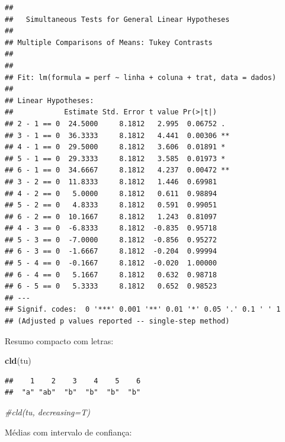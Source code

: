 \documentclass[
]{book}
\newenvironment{Shaded}{\begin{snugshade}}{\end{snugshade}}
\newcommand{\CommentTok}[1]{\textcolor[rgb]{0.56,0.35,0.01}{\textit{#1}}}
\newcommand{\DataTypeTok}[1]{\textcolor[rgb]{0.13,0.29,0.53}{#1}}
\newcommand{\KeywordTok}[1]{\textcolor[rgb]{0.13,0.29,0.53}{\textbf{#1}}}
\newcommand{\NormalTok}[1]{#1}
\newcommand{\OperatorTok}[1]{\textcolor[rgb]{0.81,0.36,0.00}{\textbf{#1}}}
\newcommand{\StringTok}[1]{\textcolor[rgb]{0.31,0.60,0.02}{#1}}
\begin{document}
\begin{verbatim}
## 
##   Simultaneous Tests for General Linear Hypotheses
## 
## Multiple Comparisons of Means: Tukey Contrasts
## 
## 
## Fit: lm(formula = perf ~ linha + coluna + trat, data = dados)
## 
## Linear Hypotheses:
##            Estimate Std. Error t value Pr(>|t|)   
## 2 - 1 == 0  24.5000     8.1812   2.995  0.06752 . 
## 3 - 1 == 0  36.3333     8.1812   4.441  0.00306 **
## 4 - 1 == 0  29.5000     8.1812   3.606  0.01891 * 
## 5 - 1 == 0  29.3333     8.1812   3.585  0.01973 * 
## 6 - 1 == 0  34.6667     8.1812   4.237  0.00472 **
## 3 - 2 == 0  11.8333     8.1812   1.446  0.69981   
## 4 - 2 == 0   5.0000     8.1812   0.611  0.98894   
## 5 - 2 == 0   4.8333     8.1812   0.591  0.99051   
## 6 - 2 == 0  10.1667     8.1812   1.243  0.81097   
## 4 - 3 == 0  -6.8333     8.1812  -0.835  0.95718   
## 5 - 3 == 0  -7.0000     8.1812  -0.856  0.95272   
## 6 - 3 == 0  -1.6667     8.1812  -0.204  0.99994   
## 5 - 4 == 0  -0.1667     8.1812  -0.020  1.00000   
## 6 - 4 == 0   5.1667     8.1812   0.632  0.98718   
## 6 - 5 == 0   5.3333     8.1812   0.652  0.98523   
## ---
## Signif. codes:  0 '***' 0.001 '**' 0.01 '*' 0.05 '.' 0.1 ' ' 1
## (Adjusted p values reported -- single-step method)
\end{verbatim}

Resumo compacto com letras:

\begin{Shaded}
\begin{Highlighting}[]
\KeywordTok{cld}\NormalTok{(tu)}
\end{Highlighting}
\end{Shaded}

\begin{verbatim}
##    1    2    3    4    5    6 
##  "a" "ab"  "b"  "b"  "b"  "b"
\end{verbatim}

\begin{Shaded}
\begin{Highlighting}[]
\CommentTok{#cld(tu, decreasing=T)}
\end{Highlighting}
\end{Shaded}

Médias com intervalo de confiança:

\begin{Shaded}
\end{Shaded}
\end{document}

